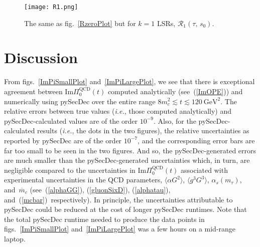 \documentclass[12pt, letterpaper]{article}
\renewcommand{\Im}{\mathrm{Im}}
\newcommand{\lsr}{\mathcal{R}}
\newcommand{\vev}[1]{\ensuremath{\langle #1\rangle}}
\newcommand{\aGG}{\vev{\alpha G^2}}
\newcommand{\gggGGG}{\vev{g^3 G^3}}
\newcommand{\gev}{\ensuremath{\text{GeV}}}
\newcommand{\ie}{\textit{i.e.}}
\begin{document}
%
\begin{figure}[htbp]
\begin{center}
  \texttt{[image: R1.png]}
\end{center}
\caption{\label{RonePlot}
  The same as fig.~\ref{RzeroPlot} but for $k=1$ LSRs, $\lsr_1(\tau,\,s_0)$.
}
\end{figure}
%

\section{Discussion}

From figs.~\ref{ImPiSmallPlot} and~\ref{ImPiLargePlot}, we see that there is exceptional 
agreement between $\Im\Pi_0^{\text{QCD}}(t)$ computed analytically (see~(\ref{ImOPE}))
and numerically using pySecDec over the entire range $8m_c^2\lesssim t \lesssim 120\ \gev^2$.
The relative errors between true values (\ie, those computed analytically)
and pySecDec-calculated values are of the order $10^{-9}$.
Also, for the pySecDec-calculated results (\ie, the dots in the two figures), the
relative uncertainties as reported by pySecDec are of the order $10^{-7}$,
and the corresponding error bars are far too small to be 
seen in the two figures.
And so, the pySecDec-generated errors are much smaller than the pySecDec-generated
uncertainties which, in turn, are negligible
compared to the uncertainties in $\Im\Pi_0^{\text{QCD}}(t)$
associated with experimental uncertainties in the QCD parameters, 
$\aGG$, $\gggGGG$, $\alpha_s(m_{\tau})$, and~$\overline{m}_c$ 
(see~(\ref{alphaGG}), (\ref{gluonSixD}), (\ref{alphatau}), and~(\ref{mcbar})~respectively).
In principle, the uncertainties attributable to pySecDec could
be reduced at the cost of longer pySecDec runtimes. 
Note that the total pySecDec runtime needed to produce the data points in 
figs.~\ref{ImPiSmallPlot} and~\ref{ImPiLargePlot} was a few hours 
on a mid-range laptop.
\end{document}
